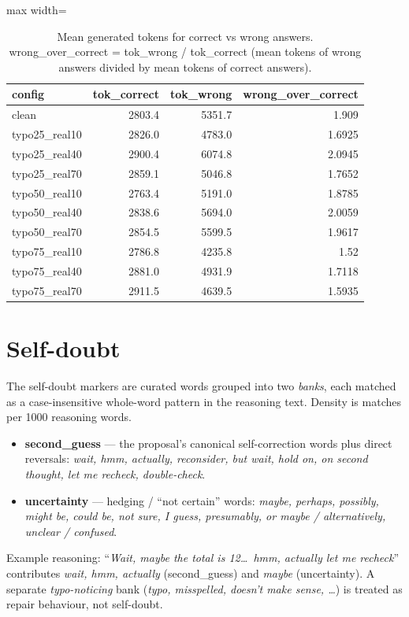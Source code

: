 \documentclass[11pt]{article}
\begin{document}
\begin{table}[H]
\centering
\caption{Mean generated tokens for correct vs wrong answers. wrong\_over\_correct = tok\_wrong / tok\_correct (mean tokens of wrong answers divided by mean tokens of correct answers).}
\small
\begin{adjustbox}{max width=\textwidth}
\begin{tabular}{lrrr}
\toprule
\textbf{config} & \textbf{tok\_correct} & \textbf{tok\_wrong} & \textbf{wrong\_over\_correct} \\
\midrule
clean & 2803.4 & 5351.7 & 1.909 \\
typo25\_real10 & 2826.0 & 4783.0 & 1.6925 \\
typo25\_real40 & 2900.4 & 6074.8 & 2.0945 \\
typo25\_real70 & 2859.1 & 5046.8 & 1.7652 \\
typo50\_real10 & 2763.4 & 5191.0 & 1.8785 \\
typo50\_real40 & 2838.6 & 5694.0 & 2.0059 \\
typo50\_real70 & 2854.5 & 5599.5 & 1.9617 \\
typo75\_real10 & 2786.8 & 4235.8 & 1.52 \\
typo75\_real40 & 2881.0 & 4931.9 & 1.7118 \\
typo75\_real70 & 2911.5 & 4639.5 & 1.5935 \\
\bottomrule
\end{tabular}
\end{adjustbox}
\end{table}

\section*{Self-doubt}
\noindent The self-doubt markers are curated words grouped into two
\emph{banks}, each matched as a case-insensitive whole-word pattern in the reasoning
text. Density is matches per 1000 reasoning words.
\begin{itemize}\setlength{\itemsep}{1pt}
  \item \textbf{second\_guess} --- the proposal's canonical self-correction words plus
  direct reversals: \emph{wait, hmm, actually, reconsider, but wait, hold on, on second
  thought, let me recheck, double-check}.
  \item \textbf{uncertainty} --- hedging / ``not certain'' words: \emph{maybe, perhaps,
  possibly, might be, could be, not sure, I guess, presumably, or maybe / alternatively,
  unclear / confused}.
\end{itemize}
\noindent Example reasoning: ``\emph{Wait, maybe the total is 12\dots\ hmm, actually let
me recheck}'' contributes \emph{wait, hmm, actually} (second\_guess) and \emph{maybe}
(uncertainty). A separate \emph{typo-noticing} bank (\emph{typo, misspelled, doesn't make
sense, \dots}) is treated as repair behaviour, not self-doubt.
\medskip
\end{document}
